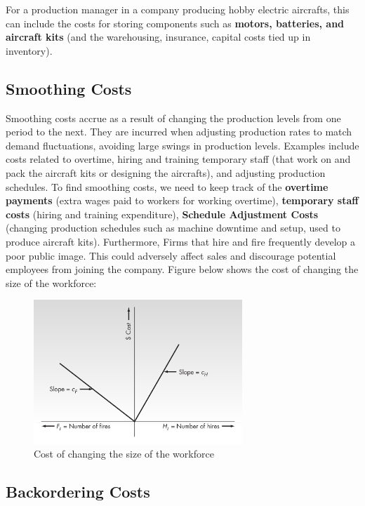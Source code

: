 \documentclass[12pt]{article}
\begin{document}
\noindent For a production manager in a company producing hobby electric aircrafts, this can include the costs for storing components such as \textbf{motors, batteries, and aircraft kits} (and the warehousing, insurance, capital costs tied up in inventory).

\subsection*{Smoothing Costs}
Smoothing costs accrue as a result of changing the production levels from one period to the next. They are incurred when adjusting production rates to match demand fluctuations, avoiding large swings in production levels. Examples include costs related to overtime, hiring and training temporary staff (that work on and pack the aircraft kits or designing the aircrafts), and adjusting production schedules. To find smoothing costs, we need to keep track of the \textbf{overtime payments} (extra wages paid to workers for working overtime), \textbf{temporary staff costs} (hiring and training expenditure), \textbf{Schedule Adjustment Costs} (changing production schedules such as machine downtime and setup, used to produce aircraft kits). Furthermore, Firms that hire and fire frequently develop a poor public image. This could adversely affect sales and discourage potential employees from joining the company. Figure below shows the cost of changing the size of the workforce: 

\begin{figure}[H]
    \centering
    \includegraphics[width=0.7\textwidth]{Images/costofhiring.png}
    \caption{Cost of changing the size of the workforce}
    \label{fig:1-smoothingcost}
\end{figure} 

\subsection*{Backordering Costs}
\end{document}
